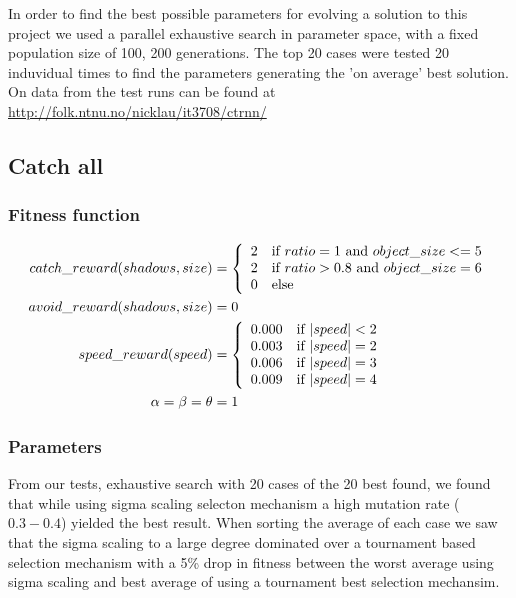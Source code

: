\documentclass[12pt]{article}
\begin{document}
In order to find the best possible parameters for evolving a solution to this project we used a parallel exhaustive search in parameter space, with a fixed population size of 100, 200 generations. The top 20 cases were tested 20 induvidual times to find the parameters generating the 'on average' best solution. On data from the test runs can be found at \url{http://folk.ntnu.no/nicklau/it3708/ctrnn/}
	\subsection{Catch all}
		\subsubsection{Fitness function}\label{sec:fitness1}
			\begin{align}
				catch\_reward(shadows, size) &= \left\{ 
				\begin{array}{l l}
					2 &\text{if $ratio=1$ and $object\_size <= 5$} \\
					2 &\text{if $ratio>0.8$ and $object\_size = 6$}\\
					0 &\text{else}
       \end{array} \right.\nonumber\\
				avoid\_reward(shadows, size) &= 0\nonumber\\
				speed\_reward(speed) &= \left\{ 
				\begin{array}{l l}
					0.000 &\text{if $|speed| < 2$} \\
					0.003 &\text{if $|speed| = 2$} \\
					0.006 &\text{if $|speed| = 3$} \\
					0.009 &\text{if $|speed| = 4$} \\
       \end{array} \right.\nonumber\\
			 \alpha =\beta =\theta &= 1\nonumber
			\end{align}
		\subsubsection{Parameters}
			From our tests, exhaustive search with 20 cases of the 20 best found, we found that while using sigma scaling selecton mechanism a high mutation rate ($0.3-0.4$) yielded the best result. When sorting the average of each case we saw that the sigma scaling to a large degree dominated over a tournament based selection mechanism with a 5\% drop in fitness between the worst average using sigma scaling and best average of using a tournament best selection mechansim.
\end{document}
